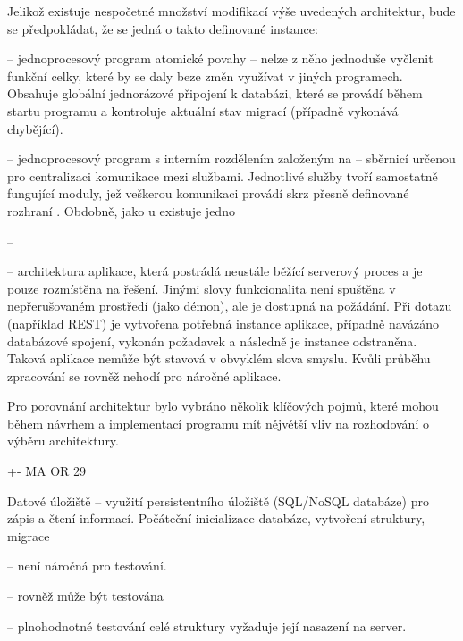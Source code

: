 Jelikož existuje nespočetné množství modifikací výše uvedených architektur, bude se předpokládat, že se jedná o takto definované instance:



\begin{dl}
   \item[\g{MA}] – jednoprocesový program atomické povahy – nelze z něho jednoduše vyčlenit funkční celky, které by se daly beze změn využívat v jiných programech.
   Obsahuje globální jednorázové připojení k databázi, které se provádí během startu programu a kontroluje aktuální stav migrací (případně vykonává chybějící).
   \item[\g{SOA}] – jednoprocesový program s interním rozdělením založeným na  – sběrnicí určenou pro centralizaci komunikace mezi službami.
   Jednotlivé služby tvoří samostatně fungující moduly, jež veškerou komunikaci provádí skrz přesně definované rozhraní .
   Obdobně, jako u  existuje jedno
   \item[\g{MSA}] –
   \item[\g{SA}] – architektura aplikace, která postrádá neustále běžící serverový proces a je pouze rozmístěna na  řešení.
   Jinými slovy funkcionalita není spuštěna v nepřerušovaném prostředí (jako démon), ale je dostupná na požádání.
   Při dotazu (například REST) je vytvořena potřebná instance aplikace, případně navázáno databázové spojení, vykonán požadavek a následně je instance odstraněna.
   Taková aplikace nemůže být stavová v obvyklém slova smyslu.
   Kvůli průběhu zpracování se rovněž nehodí pro náročné aplikace. 
\end{dl}

Pro porovnání architektur bylo vybráno několik klíčových pojmů, které mohou během návrhem a implementací programu mít nějvětší vliv na rozhodování o výběru architektury.

+- MA OR 29


\begin{dl}
   \item[Datové úložiště] – využití persistentního úložiště (SQL/NoSQL databáze) pro zápis a čtení informací.
   Počáteční inicializace databáze, vytvoření struktury, migrace
\end{dl}
\begin{ul}
   \item {} – není náročná pro testování.
   \item {} – rovněž může být testována
   \item {} – plnohodnotné testování celé struktury vyžaduje její nasazení na server.
\end{ul}

